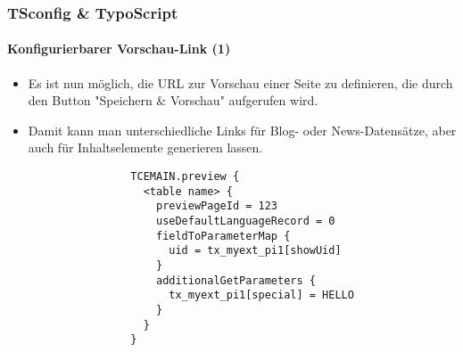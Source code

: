 %
\begin{frame}[fragile]
	\frametitle{TSconfig \& TypoScript}
	\framesubtitle{Konfigurierbarer Vorschau-Link (1)}

	\lstset{basicstyle=\tiny\ttfamily}

	\begin{itemize}
		\item Es ist nun möglich, die URL zur Vorschau einer Seite zu definieren,
			die durch den Button "Speichern \& Vorschau" aufgerufen wird.

		\item Damit kann man unterschiedliche Links für Blog- oder News-Datensätze,
			aber auch für Inhaltselemente generieren lassen.

			\begin{lstlisting}
				TCEMAIN.preview {
				  <table name> {
				    previewPageId = 123
				    useDefaultLanguageRecord = 0
				    fieldToParameterMap {
				      uid = tx_myext_pi1[showUid]
				    }
				    additionalGetParameters {
				      tx_myext_pi1[special] = HELLO
				    }
				  }
				}
			\end{lstlisting}

	\end{itemize}

\end{frame}

